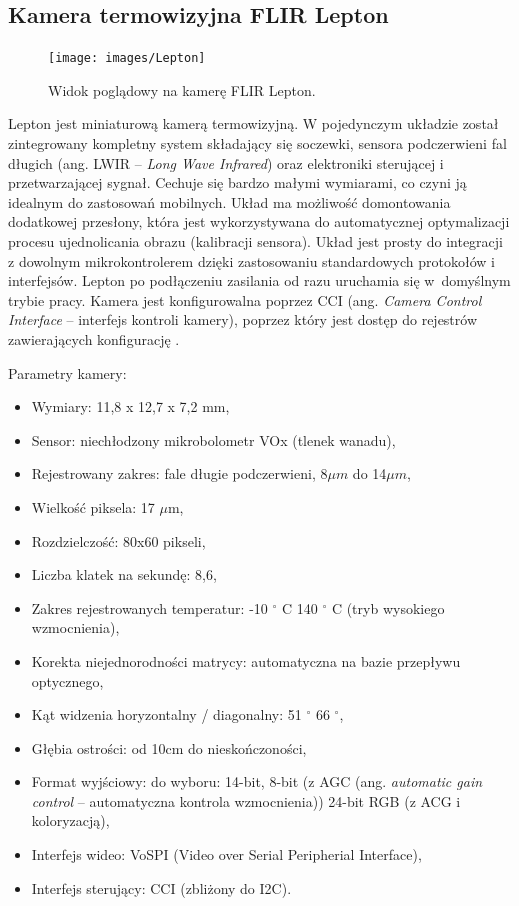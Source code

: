 
\subsection{Kamera termowizyjna FLIR Lepton}
\begin{figure}[h]
\centering
\texttt{[image: images/Lepton]}
\caption{Widok poglądowy na kamerę FLIR Lepton.}
\label{fig:lepton}
\end{figure}

Lepton jest miniaturową kamerą termowizyjną. W pojedynczym układzie został zintegrowany kompletny system składający się soczewki, sensora podczerwieni fal długich (ang. LWIR -- \textit{Long Wave Infrared}) oraz elektroniki sterującej i przetwarzającej sygnał.
Cechuje się bardzo małymi wymiarami, co czyni ją idealnym do zastosowań mobilnych.
Układ ma możliwość domontowania dodatkowej przesłony, która jest wykorzystywana do automatycznej optymalizacji procesu ujednolicania obrazu (kalibracji sensora).
Układ jest prosty do integracji z dowolnym mikrokontrolerem dzięki zastosowaniu standardowych protokołów i interfejsów. %
Lepton po podłączeniu zasilania od razu uruchamia się w~domyślnym trybie pracy. Kamera jest konfigurowalna poprzez CCI (ang. \textit{Camera Control Interface} – interfejs kontroli kamery), poprzez który jest dostęp do rejestrów zawierających konfigurację \cite{lepton}. %

Parametry kamery:
\begin{itemize}
\item Wymiary: 11,8 x 12,7 x 7,2 mm, 
\item Sensor: niechłodzony mikrobolometr VOx (tlenek wanadu),
\item Rejestrowany zakres: fale długie podczerwieni, 8$\mu m$ do 14$\mu m$,
\item Wielkość piksela: 17 $\mu$m,
\item Rozdzielczość: 80x60 pikseli,
\item Liczba klatek na sekundę: 8,6,  %
\item Zakres rejestrowanych temperatur: -10  $^\circ$  C 140  $^\circ$  C (tryb wysokiego wzmocnienia),
\item Korekta niejednorodności matrycy: automatyczna na bazie przepływu optycznego, %
\item Kąt widzenia horyzontalny / diagonalny: 51 $^\circ$  66 $^\circ$,
\item Głębia ostrości: od 10cm do nieskończoności,
\item Format wyjściowy: do wyboru: 14-bit, 8-bit (z AGC (ang. \textit{automatic gain control} -- automatyczna kontrola wzmocnienia)) 24-bit RGB (z ACG i koloryzacją),
\item Interfejs wideo: VoSPI (Video over Serial Peripherial Interface),
\item Interfejs sterujący: CCI (zbliżony do I2C).
\end{itemize}

